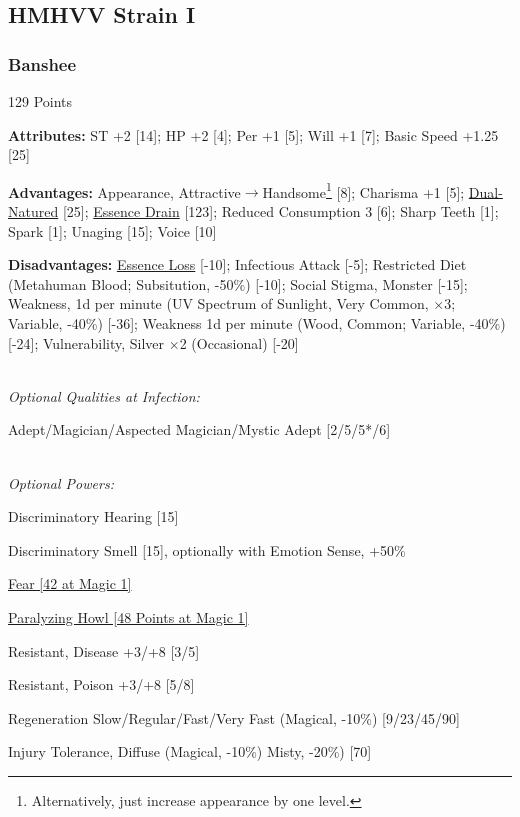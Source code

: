 \begin{multicols*}{3}
	
	\subsection*{HMHVV Strain I}
	
	\subsubsection{Banshee}\label{banshee}
	\begin{flushright}
		129 Points
	\end{flushright}
	
	\textbf{Attributes:}
	ST +2 [14]; HP +2 [4]; Per +1 [5]; Will +1 [7]; Basic Speed +1.25 [25]
	
	\textbf{Advantages:}
	Appearance, Attractive$\rightarrow$Handsome\footnote{Alternatively, just increase appearance by one level.} [8]; Charisma +1 [5]; \hyperref[dual_natured]{Dual-Natured} [25]; \hyperref[essence_drain]{Essence Drain} [123]; Reduced Consumption 3 [6]; Sharp Teeth [1]; Spark [1]; Unaging [15]; Voice [10]
	
	\textbf{Disadvantages:}	
	\hyperref[essence_loss]{Essence Loss} [-10]; Infectious Attack [-5]; Restricted Diet (Metahuman Blood; Subsitution, -50\%) [-10]; Social Stigma, Monster [-15]; Weakness, 1d per minute (UV Spectrum of Sunlight, Very Common, $\times$3; Variable, -40\%) [-36]; Weakness 1d per minute (Wood, Common; Variable, -40\%) [-24]; Vulnerability, Silver $\times$2 (Occasional) [-20]
	
	\textit{\\Optional Qualities at Infection:}
	
	Adept/Magician/Aspected Magician/Mystic Adept [2/5/5*/6]
	
	\textit{\\Optional Powers:}
	
	Discriminatory Hearing [15]
	
	Discriminatory Smell [15], optionally with Emotion Sense, +50\%
	
	\hyperref[fear]{Fear [42 at Magic 1]}
	
	\hyperref[paralyzing_howl]{Paralyzing Howl [48 Points at Magic 1]}
	
	Resistant, Disease +3/+8 [3/5]
	
	Resistant, Poison +3/+8 [5/8]
	
	Regeneration Slow/Regular/Fast/Very Fast (Magical, -10\%) [9/23/45/90]
	
	Injury Tolerance, Diffuse (Magical, -10\%) Misty, -20\%) [70]
	

\end{multicols*}
